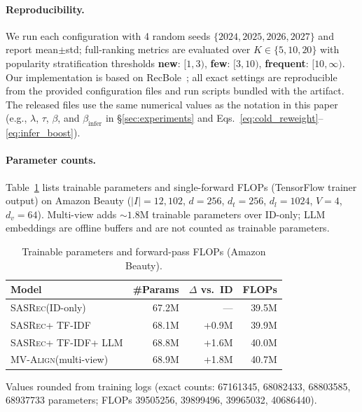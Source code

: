 \documentclass[sigconf,natbib=true,anonymous]{acmart}
\newcommand{\model}{\textsc{MV-Align}\xspace}
\newcommand{\base}{\textsc{SASRec}\xspace}
\newcommand{\tfidf}{\textsc{TF-IDF}\xspace}
\newcommand{\llm}{\textsc{LLM}\xspace}
\begin{document}
\paragraph{Reproducibility.}
We run each configuration with 4 random seeds
$\{2024, 2025, 2026, 2027\}$ and report mean$\pm$std;
full-ranking metrics are evaluated over $K\in\{5,10,20\}$
with popularity stratification thresholds
\textbf{new}: $[1,3)$, \textbf{few}: $[3,10)$,
\textbf{frequent}: $[10,\infty)$. Our implementation is based on
RecBole~\cite{zhao2021recbole}; all exact settings are
reproducible from the provided configuration files and run scripts
bundled with the artifact.
The released files use the same numerical values as the notation in this paper
(e.g., $\lambda$, $\tau$, $\beta$, and $\beta_{\text{infer}}$ in
\S\ref{sec:experiments} and Eqs.~\eqref{eq:cold_reweight}--\eqref{eq:infer_boost}).

\paragraph{Parameter counts.}
Table~\ref{tab:params} lists trainable parameters and single-forward
FLOPs (TensorFlow trainer output) on Amazon Beauty ($|I|=12,102$,
$d=256$, $d_t=256$, $d_l=1024$, $V=4$, $d_v=64$).
Multi-view adds ${\sim}1.8$M trainable parameters over ID-only; \llm
embeddings are offline buffers and are not counted as trainable
parameters.

\begin{table}[h]
\caption{Trainable parameters and forward-pass FLOPs (Amazon Beauty).}
\label{tab:params}
\centering
\small
\begin{tabular}{lrrr}
\toprule
\textbf{Model} & \textbf{\#Params} & \textbf{$\Delta$ vs.\ ID} & \textbf{FLOPs} \\
\midrule
\base (ID-only) & 67.2M & --- & 39.5M \\
\base + \tfidf & 68.1M & +0.9M & 39.9M \\
\base + \tfidf + \llm & 68.8M & +1.6M & 40.0M \\
\model (multi-view) & 68.9M & +1.8M & 40.7M \\
\bottomrule
\end{tabular}
\vspace{0.35em}
{\scriptsize Values rounded from training logs (exact counts:
\num{67161345}, \num{68082433}, \num{68803585}, \num{68937733} parameters;
FLOPs \num{39505256}, \num{39899496}, \num{39965032}, \num{40686440}).}
\end{table}
\end{document}
